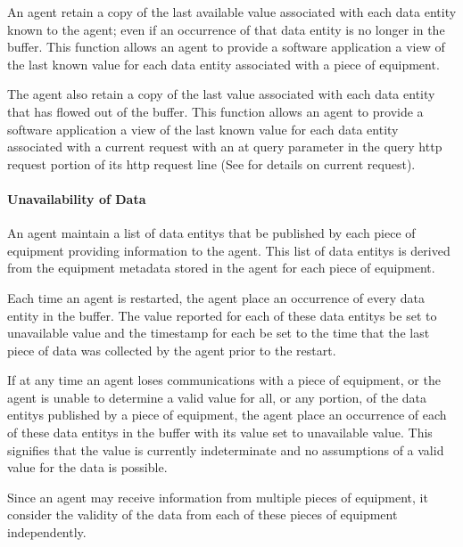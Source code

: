 \documentclass{mtconnect}	%
\begin{document}
An \gls{agent} \MUST retain a copy of the last available value associated with each \gls{data entity} known to the \gls{agent}; even if an occurrence of that \gls{data entity} is no longer in the \gls{buffer}.  This function allows an \gls{agent} to provide a software application a view of the last known value for each \gls{data entity} associated with a piece of equipment.

The \gls{agent} \MUST also retain a copy of the last value associated with each \gls{data entity} that has flowed out of the \gls{buffer}.  This function allows an \gls{agent} to provide a software application a view of the last known value for each \gls{data entity} associated with a \gls{current request} with an \gls{at query} parameter in the \gls{query http request} portion of its \gls{http request line} (See  for details on \gls{current request}).

\newpage

\paragraph{Unavailability of Data}\mbox{}

An \gls{agent} \MUST maintain a list of \glspl{data entity} that \MAY be published by each piece of equipment providing information to the \gls{agent}.   This list of \glspl{data entity} is derived from the \gls{equipment metadata} stored in the \gls{agent} for each piece of equipment.

Each time an \gls{agent} is restarted, the \gls{agent} \MUST place an occurrence of every \gls{data entity} in the \gls{buffer}.  The value reported for each of these \glspl{data entity} \MUST be set to \gls{unavailable value} and the \gls{timestamp} for each \MUST be set to the time that the last piece of data was collected by the \gls{agent} prior to the restart.

If at any time an \gls{agent} loses communications with a piece of equipment, or the \gls{agent} is unable to determine a valid value for all, or any portion, of the \glspl{data entity} published by a piece of equipment, the \gls{agent} \MUST place an occurrence of each of these \glspl{data entity} in the \gls{buffer} with its value set to \gls{unavailable value}.  This signifies that the value is currently indeterminate and no assumptions of a valid value for the data is possible.

Since an \gls{agent} may receive information from multiple pieces of equipment, it \MUST consider the validity of the data from each of these pieces of equipment independently.
\end{document}
